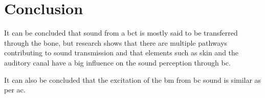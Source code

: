 \section{Conclusion}

It can be concluded that sound from a \gls{bct} is mostly said to be transferred through the bone, but research shows that there are multiple pathways contributing to sound transmission and that elements such as skin and the auditory canal have a big influence on the sound perception through \gls{bc}. %

It can also be concluded that the excitation of the \gls{bm} from \gls{bc} sound is similar as per \gls{ac}. %



